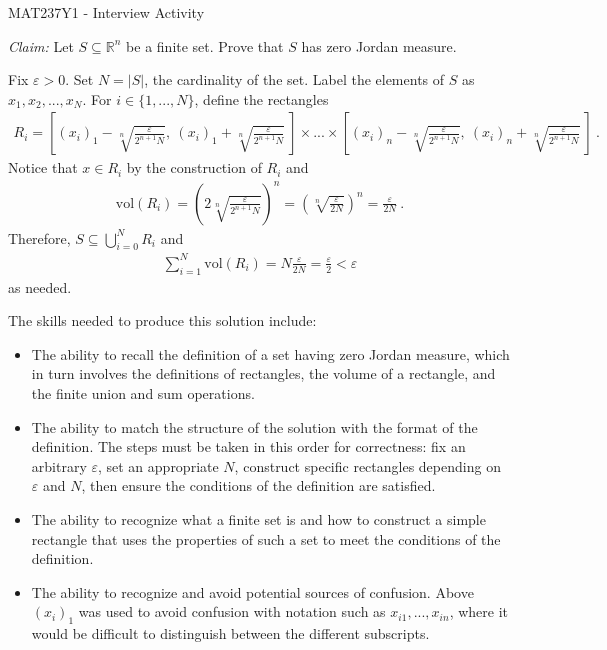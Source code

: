 \documentclass[answers]{exam}
\begin{document}
\begin{center}
{\Large MAT237Y1 - Interview Activity}
\end{center}

\begin{questions}

\question \textit{Claim:} Let $S\subseteq\mathbb{R}^n$ be a finite set. Prove that $S$ has zero Jordan measure.

\begin{solution}
Fix $\varepsilon > 0$. Set $N = |S|$, the cardinality of the set. Label the elements of $S$ as $x_1,x_2,...,x_N$. For $i\in\{1,...,N\}$, define the rectangles\begin{align*}
    R_i = \left[(x_i)_1-\sqrt[n]{\frac{\varepsilon}{2^{n+1} N}},\ (x_i)_1+\sqrt[n]{\frac{\varepsilon}{2^{n+1} N}}\ \right]\times...\times\left[(x_i)_n-\sqrt[n]{\frac{\varepsilon}{2^{n+1} N}},\ (x_i)_n+\sqrt[n]{\frac{\varepsilon}{2^{n+1} N}}\ \right]\ .
\end{align*} Notice that $x\in R_i$ by the construction of $R_i$ and\begin{align*}
    \text{vol}(R_i)=(2\sqrt[n]{\frac{\varepsilon}{2^{n+1} N}})^n=(\sqrt[n]{\frac{\varepsilon}{2N}})^n=\frac{\varepsilon}{2N}\ .
\end{align*}Therefore, $S\subseteq\bigcup_{i=0}^N R_i$ and\begin{align*}
    \sum_{i=1}^N \text{vol}(R_i)=N\frac{\varepsilon}{2N}=\frac{\varepsilon}{2}<\varepsilon
\end{align*}as needed.
\end{solution}

\end{questions}

The skills needed to produce this solution include:\begin{itemize}
    \item The ability to recall the definition of a set having zero Jordan measure, which in turn involves the definitions of rectangles, the volume of a rectangle, and the finite union and sum operations.
    \item The ability to match the structure of the solution with the format of the definition. The steps must be taken in this order for correctness: fix an arbitrary $\varepsilon$, set an appropriate $N$, construct specific rectangles depending on $\varepsilon$ and $N$, then ensure the conditions of the definition are satisfied.
    \item The ability to recognize what a finite set is and how to construct a simple rectangle that uses the properties of such a set to meet the conditions of the definition.
    \item The ability to recognize and avoid potential sources of confusion. Above $(x_i)_1$ was used to avoid confusion with notation such as $x_{i1},...,x_{in}$, where it would be difficult to distinguish between the different subscripts.
\end{itemize}
\end{document}
